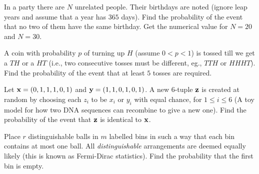 \documentclass[preprint,  11pt]{amsart}
\def\x{{\bf x}}
\def\y{{\bf y}}
\def\z{{\bf z}}
\begin{document}
\bigskip
\bepr In a party there are $N$ unrelated people. Their birthdays are noted (ignore leap years and assume that a year has $365$ days). Find the probability of the event that no two of them have the same birthday. Get the numerical value for $N=20$ and $N=30$.
\eepr

\medskip
{}
\eepr

\medskip
{}
\eepr

\medskip
\bepr A coin with probability $p$ of turning up $H$ (assume $0<p<1$) is tossed till we get a $TH$ or a $HT$ (i.e., two consecutive tosses must be different, eg., $TTH$ or $HHHT$). Find the probability of the event that at least $5$ tosses are required.
\eepr

\medskip
{}
\eepr

\medskip
\bepr Let $\x=(0,1,1,1,0,1)$ and $\y=(1,1,0,1,0,1)$. A new $6$-tuple $\z$ is created at random by choosing each $z_{i}$ to be $x_{i}$ or $y_{i}$ with equal chance, for $1\le i\le 6$ (A toy model for how two DNA sequences can recombine to give a new one). Find the probability of the event that $\z$ is identical to $\x$.
\eepr

\medskip
{}
\eepr

\medskip
\bepr Place $r$ distinguishable balls in $m$ labelled bins in such a way that each bin contains at most one ball. All {\em distinguishable} arrangements are deemed equally likely (this is known as Fermi-Dirac statistics). Find the probability that the first bin is empty.
\eepr
\end{document}
